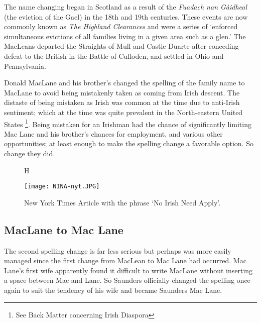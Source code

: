The name changing began in Scotland as a result of the \emph{Fuadach nan G\`{a}idheal} (the eviction of the Gael) in the 18th and 19th centuries. These events are now commonly known as \emph{The Highland Clearances} and were a series of `enforced simultaneous evictions of all families living in a given area such as a glen\cite{Wat1990}.' The MacLeans departed the Straights of Mull and Castle Duarte after conceding defeat to the British in the Battle of Culloden, and settled in Ohio and Pennsylvania. 

Donald MacLane and his brother's changed the spelling of the family name to MacLane to avoid being mistakenly taken as coming from Irish descent. The distaste of being mistaken as Irish was common at the time due to anti-Irish sentiment; which at the time was quite prevalent in the North-eastern United States \footnote{See Back Matter concerning Irish Diaspora}. Being mistaken for an Irishman had the chance of significantly limiting Mac Lane and his brother's chances for employment, and various other opportunities; at least enough to make the spelling change a favorable option. So change they did\cite{Mac2005}.

\pagebreak

\begin{figure}{H}
\begin{center}
\texttt{[image: NINA-nyt.JPG]} 
\end{center}
\caption{New York Times Article with the phrase `No Irish Need Apply'.}
\end{figure}
\cite{NYT1900}


\subsection{MacLane to Mac Lane}

The second spelling change is far less serious but perhaps was more easily managed since the first change from MacLean to Mac Lane had occurred. Mac Lane's first wife apparently found it difficult to write MacLane without inserting a space between Mac and Lane\cite{Mac2005}. So Saunders officially changed the spelling once again to suit the tendency of his wife and became Saunders Mac Lane. 